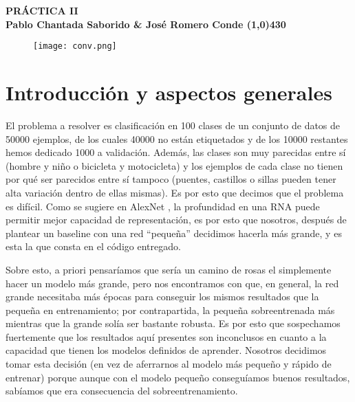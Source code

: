 \documentclass{article}
\begin{document}
\begin{center}
    \LARGE\bfseries PRÁCTICA II\\
    \small Pablo Chantada Saborido \& José Romero Conde
    \line(1,0){430}
\end{center}

\vspace{200}
\begin{figure}[h]
    \centering
    \texttt{[image: conv.png]}
    
    \label{fig:enter-label}
\end{figure}

\thispagestyle{empty}
\newpage

\section{Introducción y aspectos generales}


El problema a resolver es clasificación en 100 clases de un conjunto de datos de 50000 ejemplos, de los cuales 40000 no están etiquetados y de los 10000 restantes hemos dedicado 1000 a validación. Además, las clases son muy parecidas entre sí (hombre y niño o bicicleta y motocicleta) y los ejemplos de cada clase no tienen por qué ser parecidos entre sí tampoco (puentes, castillos o sillas pueden tener alta variación dentro de ellas mismas). Es por esto que decimos que el problema es difícil. Como se sugiere en AlexNet \cite{krizhevsky2012imagenet}, la profundidad en una RNA puede permitir mejor capacidad de representación, es por esto que nosotros, después de plantear un baseline con una red ``pequeña'' decidimos hacerla más grande, y es esta la que consta en el código entregado. 

Sobre esto, a priori pensaríamos que sería un camino de rosas el simplemente hacer un modelo más grande, pero nos encontramos con que, en general, la red grande necesitaba más épocas para conseguir los mismos resultados que la pequeña en entrenamiento; por contrapartida, la pequeña sobreentrenada más mientras que la grande solía ser bastante robusta. Es por esto que sospechamos fuertemente que los resultados aquí presentes son inconclusos en cuanto a la capacidad que tienen los modelos definidos de aprender. Nosotros decidimos tomar esta decisión (en vez de aferrarnos al modelo más pequeño y rápido de entrenar) porque aunque con el modelo pequeño conseguíamos buenos resultados, sabíamos que era consecuencia del sobreentrenamiento. \\
\end{document}
